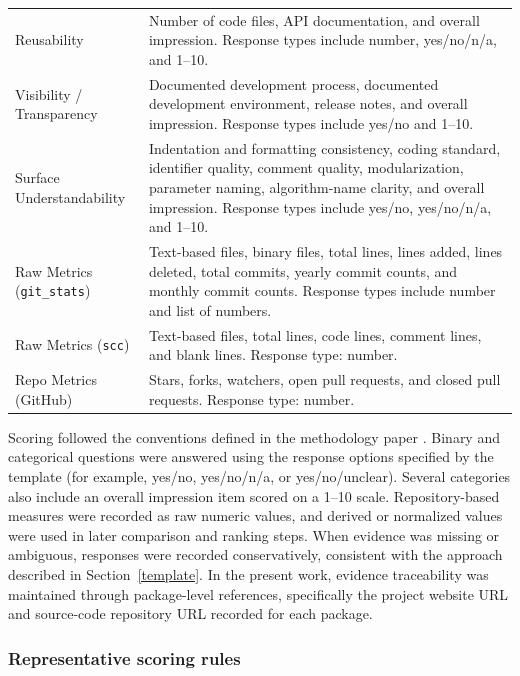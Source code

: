 \documentclass[final,1p,times,authoryear,12pt]{elsarticle}
\begin{document}
\begin{longtable}{p{} p{}}
Reusability &
Number of code files, API documentation, and overall
impression. Response types include number, yes/no/n/a,
and 1--10. \\

Visibility / Transparency &
Documented development process, documented development
environment, release notes, and overall impression.
Response types include yes/no and 1--10. \\

Surface Understandability &
Indentation and formatting consistency, coding standard,
identifier quality, comment quality, modularization,
parameter naming, algorithm-name clarity, and overall
impression. Response types include yes/no,
yes/no/n/a, and 1--10. \\

Raw Metrics (\texttt{git\_stats}) &
Text-based files, binary files, total lines, lines
added, lines deleted, total commits, yearly commit
counts, and monthly commit counts. Response types
include number and list of numbers. \\

Raw Metrics (\texttt{scc}) &
Text-based files, total lines, code lines, comment
lines, and blank lines. Response type: number. \\

Repo Metrics (GitHub) &
Stars, forks, watchers, open pull requests, and closed
pull requests. Response type: number. \\
\end{longtable}

Scoring followed the conventions defined in the methodology
paper \cite{MethodologyPaper}. Binary and categorical
questions were answered using the response options specified
by the template (for example, yes/no, yes/no/n/a, or
yes/no/unclear). Several categories also include an overall
impression item scored on a 1--10 scale. Repository-based
measures were recorded as raw numeric values, and derived
or normalized values were used in later comparison and
ranking steps. When evidence was missing or ambiguous,
responses were recorded conservatively, consistent with the
approach described in Section~\ref{template}. In the present
work, evidence traceability was maintained through
package-level references, specifically the project website
URL and source-code repository URL recorded for each
package.

\subsubsection*{Representative scoring rules}
\end{document}
